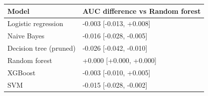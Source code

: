 \begin{tabular}{ll}
\toprule
\textbf{Model} & \textbf{AUC difference vs Random forest} \\
\midrule
Logistic regression & -0.003 [-0.013, +0.008] \\
Naive Bayes & -0.016 [-0.028, -0.005] \\
Decision tree (pruned) & -0.026 [-0.042, -0.010] \\
Random forest & +0.000 [+0.000, +0.000] \\
XGBoost & -0.003 [-0.010, +0.005] \\
SVM & -0.015 [-0.028, -0.002] \\
\bottomrule
\end{tabular}
